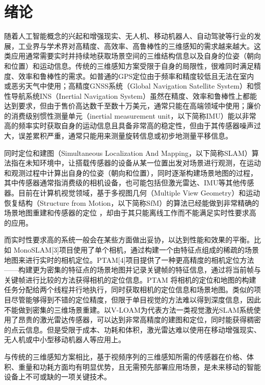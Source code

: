 \chapter{绪论}\label{ch:intro}

随着人工智能概念的兴起和增强现实、无人机、移动机器人、自动驾驶等行业的发展，工业界与学术界对高精度、高效率、高鲁棒性的三维感知的需求越来越大。这类应用通常需要实时并持续地获取场景空间的三维结构信息以及自身的位姿（朝向和位置）和运动信息。传统的三维感知方案受限于自身的局限性，很难同时满足精度、效率和鲁棒性的需求。如普通的GPS定位由于频率和精度较低且无法在室内或恶劣天气中使用；高精度GNSS系统（Global Navigation Satellite System）和惯性导航系统INS（Inertial Navigation System）虽然在精度、效率和鲁棒性上都能达到要求，但由于售价高达数千至数十万美元，通常只能在高端领域中使用；廉价的消费级别惯性测量单元（inertial measurement unit，以下简称IMU）能以非常高的频率实时获取自身的运动信息且具备非常高的稳定性，但由于其传感器噪声过大，误差累积严重，通常只能用来测量旋转信息或初步地测量平移信息。

同时定位和建图（Simultaneous Localization And Mapping，以下简称SLAM）算法指在未知环境中，让搭载传感器的设备从某一位置出发对场景进行观测，在运动和观测过程中计算出自身的位姿（朝向和位置），同时逐渐构建场景地图的过程，其中传感器通常指消费级的相机设备，也可能包括但激光雷达、IMU等其他传感器。目前在计算机视觉领域，基于多视图几何（Multiple View Geometry）和运动恢复结构（Structure from Motion，以下简称SfM）的算法已经能做到非常精确的场景地图重建和传感器的定位
，却由于其只能离线工作而不能满足实时性要求高的应用。

而实时性要求高的系统一般会在某些方面做出妥协，以达到性能和效果的平衡。比如 MonoSLAM[3]项目使用了单个相机，通过构建一个由特征点组成的稀疏的场景地图来进行实时的相机定位。PTAM[4]项目提供了一种更高精度的相机定位方法——构建更为密集的特征点的场景地图并记录关键帧的特征信息，通过将当前帧与关键帧进行比较的方法获得相机的定位信息。PTAM 将相机的定位和地图的构建任务分配给两个线程并行地执行，同时获取相机的定位信息和场景地图。类似的项目尽管能够得到不错的定位精度，但限于单目视觉的方法难以得到深度信息，因此不能做到密集的三维场景重建。以V-LOAM\citep{zhang2015visual}为代表方法一类视觉激光SLAM系统使用了昂贵的激光雷达传感器，可以达到非常高精度的建图和定位，同时能获得稠密的点云信息。但是受限于成本、功耗和体积，激光雷达难以使用在移动增强现实、无人机或中小型移动机器人等应用上。

与传统的三维感知方案相比，基于视频序列的三维感知所需的传感器在价格、体积、重量和功耗方面均有明显优势，且无需预先部署应用场景，是未来移动的智能设备上不可或缺的一项关键技术。

